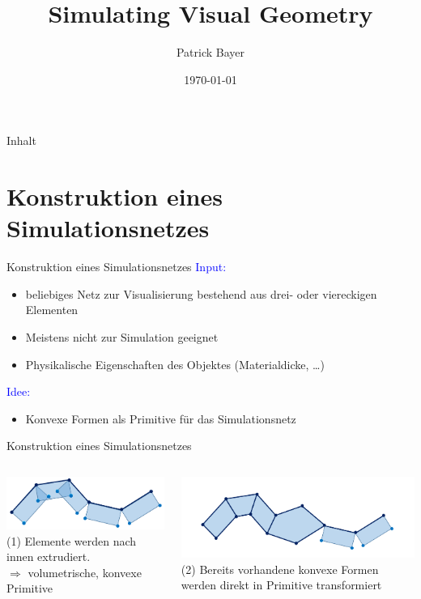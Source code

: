 \documentclass[t]{beamer}
\date{\today}
\title{Simulating Visual Geometry}
\author{Patrick Bayer}
\begin{document}
	\begin{frame}
		\titlepage
	\end{frame}
	
	\begin{frame}{Inhalt}
		\tableofcontents
	\end{frame}

	\section{Konstruktion eines Simulationsnetzes}
	\begin{frame}{Konstruktion eines Simulationsnetzes}
		\textcolor{blue}{Input:}	
		\begin{itemize}
			\item beliebiges Netz zur Visualisierung bestehend aus drei- oder viereckigen Elementen
			\item Meistens nicht zur Simulation geeignet
			\item Physikalische Eigenschaften des Objektes (Materialdicke, \dots)
		\end{itemize}
		\textcolor{blue}{Idee:}
			\begin{itemize}
					\item Konvexe Formen als Primitive für das Simulationsnetz
			\end{itemize}
		\end{frame}

	\begin{frame}{Konstruktion eines Simulationsnetzes}
		\begin{columns}
			\column{0.5\textwidth}
				\centering
				\includegraphics[scale = 0.4]{PhysicalMeshCreation_Step1.png}\\
				(1) Elemente werden nach innen extrudiert.\\
				$\Rightarrow$ volumetrische, konvexe Primitive
			
			\column{0.5\textwidth}
					\centering
					\includegraphics[scale = 0.31]{PhysicalMeshCreation_2}\\
					(2) Bereits vorhandene konvexe Formen werden direkt in Primitive transformiert
		\end{columns}
	\end{frame}
		
\end{document}
